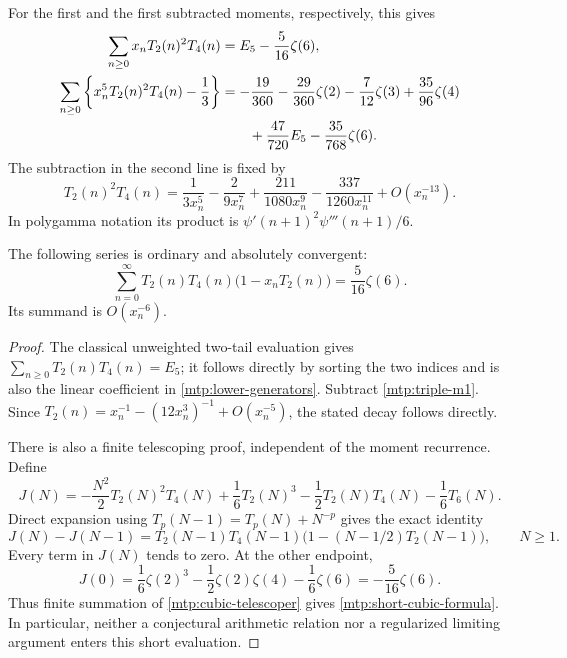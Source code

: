 For the first and the first subtracted moments, respectively, this gives
\begin{align}
 \sum_{n\ge0}x_nT_2(n)^2T_4(n)
  &=E_5-\frac5{16}\zeta(6),\label{mtp:triple-m1}\\
 \sum_{n\ge0}\left\{x_n^5T_2(n)^2T_4(n)-\frac13\right\}
  &=-\frac{19}{360}-\frac{29}{360}\zeta(2)-\frac7{12}\zeta(3)
       +\frac{35}{96}\zeta(4)\notag\\
  &\qquad+\frac{47}{720}E_5-\frac{35}{768}\zeta(6).
       \label{mtp:triple-m5}
\end{align}
The subtraction in the second line is fixed by
\[
 T_2(n)^2T_4(n)=\frac1{3x_n^5}-\frac2{9x_n^7}
                    +\frac{211}{1080x_n^9}-\frac{337}{1260x_n^{11}}
                    +O(x_n^{-13}).
\]
In polygamma notation its product is
$\psi'(n+1)^2\psi'''(n+1)/6$.

\begin{corollary}
\label{mtp:short-cubic}
The following series is ordinary and absolutely convergent:
\begin{equation}\label{mtp:short-cubic-formula}
 \boxed{\sum_{n=0}^{\infty}T_2(n)T_4(n)
                     \bigl(1-x_nT_2(n)\bigr)=\frac5{16}\zeta(6).}
\end{equation}
Its summand is $O(x_n^{-6})$.
\end{corollary}

\begin{proof}
The classical unweighted two-tail evaluation gives
$\sum_{n\ge0}T_2(n)T_4(n)=E_5$; it follows directly by sorting the
two indices and is also the linear coefficient in
\eqref{mtp:lower-generators}. Subtract \eqref{mtp:triple-m1}.
Since $T_2(n)=x_n^{-1}-(12x_n^3)^{-1}+O(x_n^{-5})$, the stated
decay follows directly.

There is also a finite telescoping proof, independent of the moment
recurrence. Define
\[
 J(N)=-\frac{N^2}{2}T_2(N)^2T_4(N)+\frac16T_2(N)^3
            -\frac12T_2(N)T_4(N)-\frac16T_6(N).
\]
Direct expansion using $T_p(N-1)=T_p(N)+N^{-p}$ gives the exact identity
\begin{equation}\label{mtp:cubic-telescoper}
 J(N)-J(N-1)=T_2(N-1)T_4(N-1)
                    \bigl(1-(N-1/2)T_2(N-1)\bigr),\qquad N\ge1.
\end{equation}
Every term in $J(N)$ tends to zero. At the other endpoint,
\[
 J(0)=\frac16\zeta(2)^3-\frac12\zeta(2)\zeta(4)-\frac16\zeta(6)
             =-\frac5{16}\zeta(6).
\]
Thus finite summation of \eqref{mtp:cubic-telescoper} gives
\eqref{mtp:short-cubic-formula}. In particular, neither a conjectural
arithmetic relation nor a regularized limiting argument enters this
short evaluation.
\end{proof}

